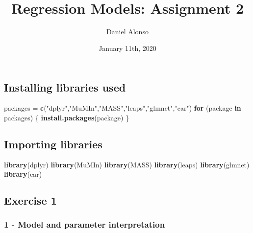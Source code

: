 \documentclass[]{article}
\title{Regression Models: Assignment 2}
\author{Daniel Alonso}
\date{January 11th, 2020}
\newenvironment{Shaded}{\begin{snugshade}}{\end{snugshade}}
\newcommand{\ControlFlowTok}[1]{\textcolor[rgb]{0.13,0.29,0.53}{\textbf{#1}}}
\newcommand{\KeywordTok}[1]{\textcolor[rgb]{0.13,0.29,0.53}{\textbf{#1}}}
\newcommand{\NormalTok}[1]{#1}
\newcommand{\StringTok}[1]{\textcolor[rgb]{0.31,0.60,0.02}{#1}}
\begin{document}
\maketitle

\hypertarget{installing-libraries-used}{%
\subsection{Installing libraries used}\label{installing-libraries-used}}

\begin{Shaded}
\begin{Highlighting}[]
\NormalTok{packages =}\StringTok{ }\KeywordTok{c}\NormalTok{(}\StringTok{"dplyr"}\NormalTok{,}\StringTok{"MuMIn"}\NormalTok{,}\StringTok{"MASS"}\NormalTok{,}\StringTok{"leaps"}\NormalTok{,}\StringTok{"glmnet"}\NormalTok{,}\StringTok{"car"}\NormalTok{)}
\ControlFlowTok{for}\NormalTok{ (package }\ControlFlowTok{in}\NormalTok{ packages) \{}
    \KeywordTok{install.packages}\NormalTok{(package)}
\NormalTok{\}}
\end{Highlighting}
\end{Shaded}

\hypertarget{importing-libraries}{%
\subsection{Importing libraries}\label{importing-libraries}}

\begin{Shaded}
\begin{Highlighting}[]
\KeywordTok{library}\NormalTok{(dplyr)}
\KeywordTok{library}\NormalTok{(MuMIn)}
\KeywordTok{library}\NormalTok{(MASS)}
\KeywordTok{library}\NormalTok{(leaps)}
\KeywordTok{library}\NormalTok{(glmnet)}
\KeywordTok{library}\NormalTok{(car)}
\end{Highlighting}
\end{Shaded}

\newpage

\hypertarget{exercise-1}{%
\subsection{Exercise 1}\label{exercise-1}}

\hypertarget{model-and-parameter-interpretation}{%
\subsubsection{1 - Model and parameter
interpretation}\label{model-and-parameter-interpretation}}
\end{document}
